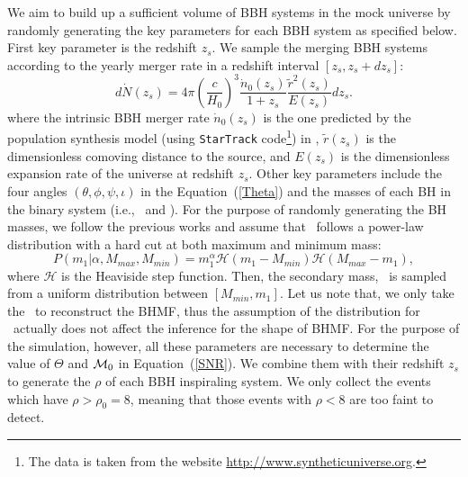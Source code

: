 \documentclass[twocolumn]{aastex62}
\begin{document}
We aim to build up a sufficient volume of BBH systems in the mock universe by randomly generating the key parameters for each BBH system as specified below. First key parameter is the redshift $z_s$.  We sample the merging BBH systems according to the yearly merger rate in a redshift interval  $[z_{s}, z_{s}+dz_{s}]$:
 \begin{equation}
 d\dot{N} (z_s)=4\pi\left(\frac{c}{H_{0}}\right)^3\frac{\dot{n}_{0}(z_{s})}{1+z_{s}}\frac{\tilde{r}^2(z_{s})}{E(z_{s})}dz_{s}. 
 \end{equation}
where the intrinsic BBH merger rate $\dot{n}_{0}(z_{s})$ is the one predicted by the population synthesis model (using {\tt StarTrack} code\footnote{The data is taken from the website \url{http://www.syntheticuniverse.org}.}) in \citet{Dominik13}, $\tilde{r}(z_{s})$ is the dimensionless comoving distance to the source, and $E (z_s)$ is
the dimensionless expansion rate of the universe at redshift $z_s$. 
Other key parameters include the four angles $(\theta, \phi, \psi, \iota)$ in the Equation~(\ref{Theta})  and the masses of each BH in the binary system (i.e., \mone\ and \mtwo).
For the purpose of randomly generating the BH masses, we follow the previous works \citep{Kovetz2017PhRvD, Abbott2018b, Fishbach2018} and assume that \mone\ follows a power-law distribution with a hard cut at both maximum and minimum mass:
 \begin{equation} \label{equ_powlaw}
P(m_1|\alpha, M_{max}, M_{min}) = m_1^{\alpha} \mathcal{H}(m_1-M_{min}) \mathcal{H}(M_{max}-m_1),
 \end{equation}
where $\mathcal{H}$ is the Heaviside step function. Then, the secondary mass, \mtwo\, is %
sampled from a uniform distribution
between $[M_{min}, m_1]$. Let us note that, we only take the \mone\ to reconstruct the BHMF, thus the assumption of the distribution for \mtwo\ actually does not affect the inference for the shape of BHMF. 
For the purpose of the simulation, however, all these parameters are necessary to determine the value of $\Theta$ and ${\cal M}_0$ in Equation~(\ref{SNR}). We combine them with their redshift $z_s$ to generate the $\rho$ of each BBH inspiraling system. We only collect the events which have $\rho > \rho_0 = 8$, meaning that those events with $\rho < 8$ are too faint to detect. 
\end{document}
